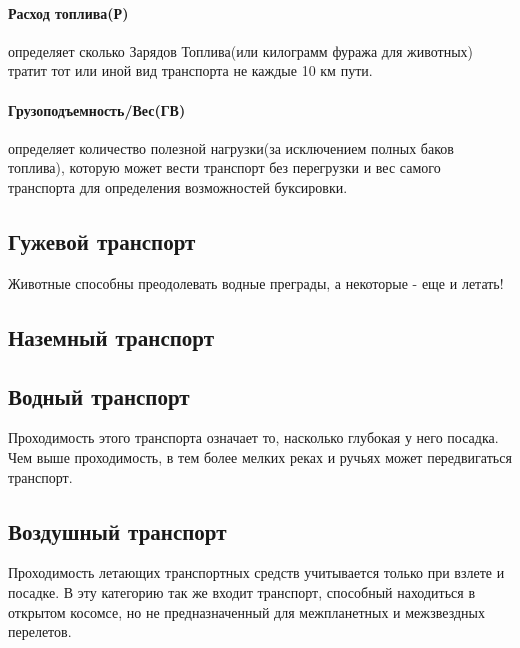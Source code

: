 \paragraph{Расход топлива(Р)} определяет сколько Зарядов Топлива(или килограмм фуража для животных) тратит тот или иной вид транспорта не каждые 10 км пути.
\paragraph{Грузоподъемность/Вес(ГВ)} определяет количество полезной нагрузки(за исключением полных баков топлива), которую может вести транспорт без перегрузки и вес самого транспорта для определения возможностей буксировки.

\subsection{Гужевой транспорт}
Животные способны преодолевать водные преграды, а некоторые - еще и летать!

\subsection{Наземный транспорт}

\subsection{Водный транспорт}
Проходимость этого транспорта означает то, насколько глубокая у него посадка. Чем выше проходимость, в тем более мелких реках и ручьях может передвигаться транспорт.

\subsection{Воздушный транспорт}
Проходимость летающих транспортных средств учитывается только при взлете и посадке. В эту категорию так же входит транспорт, способный находиться в открытом косомсе, но не предназначенный для межпланетных и межзвездных перелетов.

